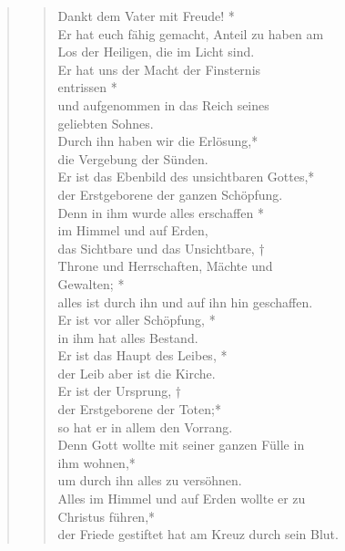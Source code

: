 \begin{quote}
\begin{verse}
Dankt dem Vater mit Freude! *\\
Er hat euch fähig gemacht, Anteil zu haben am \\Los der Heiligen, die im Licht sind.\\ \vin 
Er hat uns der Macht der Finsternis\\ \vin  entrissen *\\ \vin
und aufgenommen in das Reich seines\\ \vin  geliebten Sohnes.\\ 
Durch ihn haben wir die Erlösung,*\\
die Vergebung der Sünden.\\ \vin 
Er ist das Ebenbild des unsichtbaren Gottes,*\\ \vin
der Erstgeborene der ganzen Schöpfung.\\
Denn in ihm wurde alles erschaffen *\\
im Himmel und auf Erden,\\ \vin
 das Sichtbare und das Unsichtbare, †\\ \vin
Throne und Herrschaften, Mächte und\\ \vin  Gewalten; *\\ \vin
 alles ist durch ihn und auf ihn hin geschaffen.\\ 
Er ist vor aller Schöpfung, *\\
in ihm hat alles Bestand.\\ \vin
Er ist das Haupt des Leibes, *\\ \vin
der Leib aber ist die Kirche.\\
 Er ist der Ursprung, † \\der Erstgeborene der Toten;*\\ so hat er in allem den Vorrang.\\ \vin 
Denn Gott wollte mit seiner ganzen Fülle in\\ \vin  ihm wohnen,*\\ \vin
um durch ihn alles zu versöhnen.\\ 
Alles im Himmel und auf Erden wollte er zu\\  Christus führen,*\\
der Friede gestiftet hat am Kreuz durch sein Blut.\\ 
\end{verse}
\end{quote}
\medskip
 
